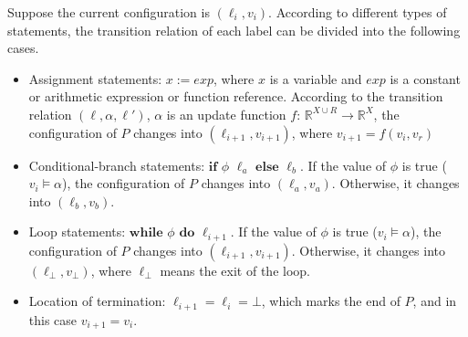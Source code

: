 \documentclass[runningheads]{llncs}
\newcommand\yx[1]{{\color{red} [YD: #1]}}
\begin{document}
Suppose the current configuration is $(\ell_i, v_i)$. According to different types of statements, the transition relation of each label can be divided into the following cases. 
\renewcommand{\labelitemi}{$\vcenter{\hbox{\tiny$\bullet$}}$}
\begin{itemize}
	\item  Assignment statements: $x:=exp$, where $x$ is a variable and $exp$ is a constant or arithmetic expression or function reference. According to the transition relation $(\ell, \alpha, \ell')$,
	$\alpha$ is an update function $f$: $\mathbb{R}^{X\cup R}\to \mathbb{R}^{X}$,
	the configuration of $P$ changes into $(\ell_{i+1}, v_{i+1})$, where $v_{i+1} = f(v_i,v_r)$
    \item  Conditional-branch statements: $\textbf{if}$ $\phi$ $\ell_a$ $\textbf{else}$ $\ell_b$. If the value of $\phi$ is true ($v_i \models \alpha$), 
    the configuration of $P$ changes into $(\ell_a, v_a)$. Otherwise, it changes into $(\ell_b, v_b)$.
	\item  Loop statements: $\textbf{while}$ $\phi$ $\textbf{do}$ $\ell_{i+1}$. If the value of $\phi$ is true ($v_i \models \alpha$), the configuration of $P$ changes into $(\ell_{i+1}, v_{i+1})$. Otherwise, it changes into $(\ell_{\bot}, v_{\bot})$, where $\ell_{\bot}$ means the exit of the loop.
	\item  Location of termination: $\ell_{i+1} =\ell_{i}=\bot$, which marks the end of $P$, and in this case $v_{i+1} = v_{i}$.
\end{itemize}
\end{document}
